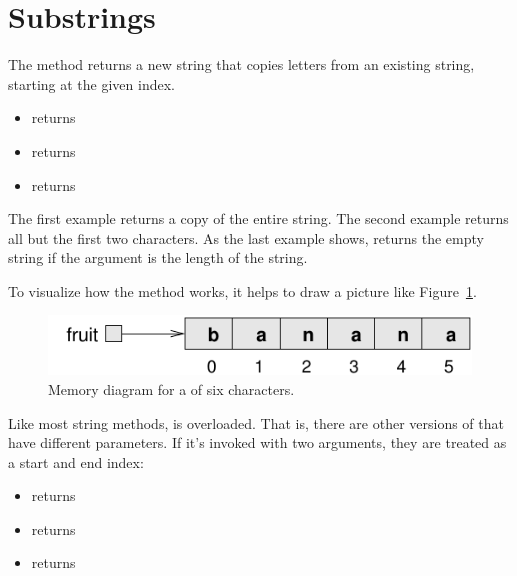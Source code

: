 \section{Substrings}

The  method returns a new string that copies letters from an existing string, starting at the given index.

\begin{itemize}
\item {} returns 
\item {} returns 
\item {} returns 
\end{itemize}

The first example returns a copy of the entire string.
The second example returns all but the first two characters.
As the last example shows,  returns the empty string if the argument is the length of the string.

To visualize how the  method works, it helps to draw a picture like Figure~\ref{fig.banana}.

\begin{figure}[!ht]
\begin{center}
\includegraphics{figs/banana.pdf}
\caption{Memory diagram for a  of six characters.}
\label{fig.banana}
\end{center}
\end{figure}


Like most string methods,  is overloaded.
That is, there are other versions of  that have different parameters.
If it's invoked with two arguments, they are treated as a start and end index:

\begin{itemize}
\item {} returns 
\item {} returns 
\item {} returns 
\end{itemize}


